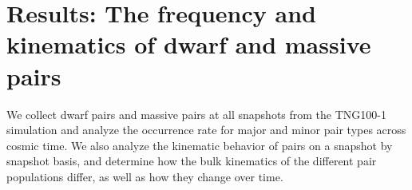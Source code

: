 \documentclass[twocolumn]{aastex631}
\newcommand{\kc}[1]{\textcolor{yellow}{\textbf{kc: #1}} }
\begin{document}



\section{Results: The frequency and kinematics of dwarf and massive pairs}
We collect dwarf pairs and massive pairs at all snapshots from the TNG100-1 simulation and analyze the occurrence rate for major and minor pair types across cosmic time.
We also analyze the kinematic behavior of pairs on a snapshot by snapshot basis, and determine how the bulk kinematics of the different pair populations differ, as well as how they change over time. 
\end{document}
